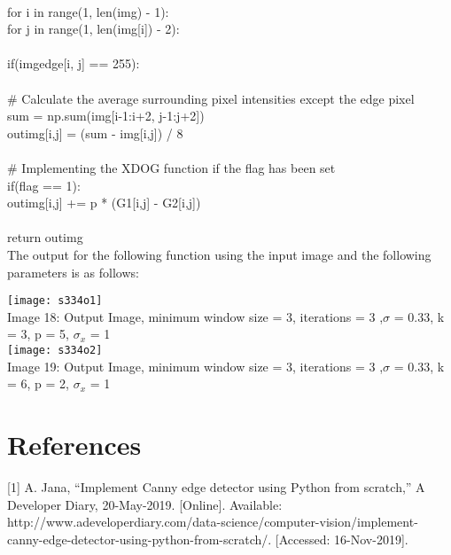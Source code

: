 \documentclass{article}
\begin{document}
	\\
	\indent for i in range(1, len(img) - 1):\\
	\indent \indent for j in range(1, len(img[i]) - 2):\\
	\\
	\indent \indent \indent if(img\textunderscore edge[i, j] == 255):\\
	\\
	\indent \indent \indent \indent \# Calculate the average surrounding pixel intensities except the edge pixel\\
	\indent \indent \indent \indent sum = np.sum(img[i-1:i+2, j-1:j+2])\\
	\indent \indent \indent \indent out\textunderscore img[i,j] = (sum - img[i,j]) / 8\\
	\\
	\indent \indent \indent \# Implementing the XDOG function if the flag has been set\\
	\indent \indent \indent if(flag == 1):\\
	\indent \indent \indent \indent out\textunderscore img[i,j] += p * (G1[i,j] - G2[i,j])\\
	\\
	\indent return out\textunderscore img\\
	
	The output for the following function using the input image and the following parameters is as follows:\\
	
	\begin{center}
		
		\texttt{[image: s334o1]}\\
		Image 18: Output Image, minimum window size = 3, iterations = 3 ,$\sigma$ = 0.33, k = 3, p = 5, $\sigma_{x}$ = 1\\
		
		\texttt{[image: s334o2]}\\
		Image 19: Output Image, minimum window size = 3, iterations = 3 ,$\sigma$ = 0.33, k = 6, p = 2, $\sigma_{x}$ = 1\\
		
	\end{center}
	
	\clearpage
	
	\section{References}
	
	[1] A. Jana, “Implement Canny edge detector using Python from scratch,” A Developer Diary, 20-May-2019. [Online]. Available: http://www.adeveloperdiary.com/data-science/computer-vision/implement-canny-edge-detector-using-python-from-scratch/. [Accessed: 16-Nov-2019].
	
\end{document}

